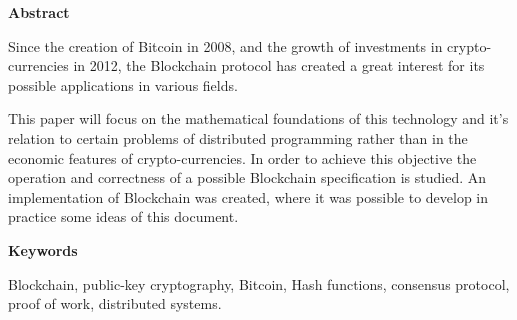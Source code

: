 
\newpage

\thispagestyle{empty}

\begin{center}

{\bf \Huge Abstract}

  \end{center}
\vspace{1cm}

Since the creation of Bitcoin in 2008, and the growth of investments in crypto-currencies in 2012, the Blockchain protocol has created a great interest for its possible applications in various fields.

This paper will focus on the mathematical foundations of this technology and it's relation to certain problems of distributed programming  rather than in the economic features of crypto-currencies. In order to achieve this objective the operation and correctness of a possible Blockchain specification is studied. An implementation of Blockchain was created, where it was possible to develop in practice some ideas of this document.
\vspace{1cm}


\begin{center}

{\bf \Large Keywords}

   \end{center}

   \vspace{0.5cm}
   
   Blockchain, public-key cryptography, Bitcoin, Hash functions, consensus protocol, proof of work, distributed systems.
   



   


